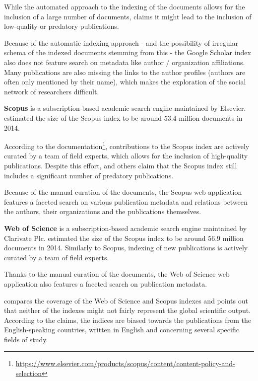 While the automated approach to the indexing of the documents allows for the inclusion of a large number of documents, 
\cite{predatory-google-scholar-scopus} claims it might lead to the inclusion of low-quality or predatory publications.

Because of the automatic indexing approach - and the possibility of irregular schema of the indexed documents stemming from this -
the Google Scholar index also does not feature search on metadata like author / organization affiliations.
Many publications are also missing the links to the author profiles (authors are often only mentioned by their name), 
which makes the exploration of the social network of researchers difficult.

\textbf{Scopus} is a subscription-based academic search engine maintained by Elsevier.
\cite{google-scholar-size-estimation-2014} estimated the size of the Scopus index to be around $53.4$ million documents in 2014.

According to the documentation\footnote{\url{https://www.elsevier.com/products/scopus/content/content-policy-and-selection}}, contributions to the Scopus index 
are actively curated by a team of field experts, which allows for the inclusion of high-quality publications.
Despite this effort, \cite{predatory-scopus} and others claim that the Scopus index still includes a significant number of predatory publications.

Because of the manual curation of the documents, the Scopus web application features a faceted search on various publication metadata
and relations between the authors, their organizations and the publications themselves.

\textbf{Web of Science} is a subscription-based academic search engine maintained by Clarivate Plc.
\cite{google-scholar-size-estimation-2014} estimated the size of the Scopus index to be around $56.9$ million documents in 2014.
Similarly to Scopus, indexing of new publications is actively curated by a team of field experts.

Thanks to the manual curation of the documents, the Web of Science web application also features a faceted search on publication metadata.

\cite{wos-scopus-not-global} compares the coverage of the Web of Science and Scopus indexes and
points out that neither of the indexes might not fairly represent the global scientific output.
According to the claims, the indices are biased towards the publications from the English-speaking countries,
written in English and concerning several specific fields of study.

